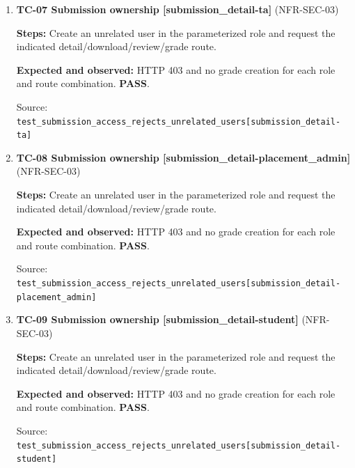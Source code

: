 \begin{enumerate}
\item \begin{minipage}[t]{\linewidth}\textbf{TC-07 Submission ownership [submission\_detail-ta]} (NFR-SEC-03)\par

\textbf{Steps:} Create an unrelated user in the parameterized role and request the indicated detail/download/review/grade route.\par

\textbf{Expected and observed:} HTTP 403 and no grade creation for each role and route combination. \textbf{PASS}.\par

{\footnotesize Source: \nolinkurl{test_submission_access_rejects_unrelated_users[submission_detail-ta]}}\end{minipage}

\item \begin{minipage}[t]{\linewidth}\textbf{TC-08 Submission ownership [submission\_detail-placement\_admin]} (NFR-SEC-03)\par

\textbf{Steps:} Create an unrelated user in the parameterized role and request the indicated detail/download/review/grade route.\par

\textbf{Expected and observed:} HTTP 403 and no grade creation for each role and route combination. \textbf{PASS}.\par

{\footnotesize Source: \nolinkurl{test_submission_access_rejects_unrelated_users[submission_detail-placement_admin]}}\end{minipage}

\item \begin{minipage}[t]{\linewidth}\textbf{TC-09 Submission ownership [submission\_detail-student]} (NFR-SEC-03)\par

\textbf{Steps:} Create an unrelated user in the parameterized role and request the indicated detail/download/review/grade route.\par

\textbf{Expected and observed:} HTTP 403 and no grade creation for each role and route combination. \textbf{PASS}.\par

{\footnotesize Source: \nolinkurl{test_submission_access_rejects_unrelated_users[submission_detail-student]}}\end{minipage}


\end{enumerate}

